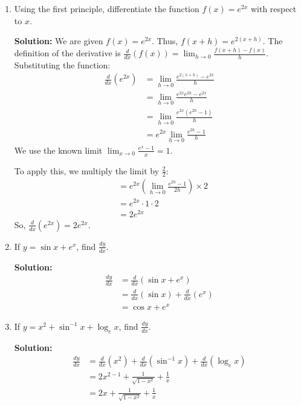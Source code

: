 \documentclass[nohyper,nobib,xcolor=dvipsnames,svgnames,x11names]{tufte-book}
\newenvironment{multiequation}{%
  \setlength{\abovedisplayskip}{3pt}      %
  \setlength{\belowdisplayskip}{6pt}      %
  \setlength{\abovedisplayshortskip}{3pt} %
  \setlength{\belowdisplayshortskip}{6pt} %
  \begin{equation}%
    \begin{aligned}%
}{%
    \end{aligned}%
  \end{equation}%
}
\newcommand{\fancymarginnote}[2][0pt]{%
  \marginnote[#1]{%
    \tikz[baseline=(text.base)]{%
      \node[
        fill=lightorange,
        draw=SeaGreen,
        line width=1pt,
        text=darkrose,
        rounded corners=3pt,
        inner sep=4pt,
        text width=\dimexpr\marginparwidth-8pt\relax,
        font=\footnotesize
      ] (text) {#2};
    }%
  }%
}
\begin{document}
\begin{enumerate}
    \item Using the first principle, differentiate the function $f(x)=e^{2x}$ with respect to $x$.
    
    \textbf{Solution:}
    We are given $f(x)=e^{2x}$. Thus, $f(x+h)=e^{2(x+h)}$.
    The definition of the derivative is $\frac{d}{dx}(f(x))=\lim_{h\to0}\frac{f(x+h)-f(x)}{h}$.
    Substituting the function:
    \begin{multiequation}
        \frac{d}{dx}(e^{2x}) &= \lim_{h\to0}\frac{e^{2(x+h)}-e^{2x}}{h} \\
        &= \lim_{h\to0}\frac{e^{2x}e^{2h}-e^{2x}}{h} \\
        &= \lim_{h\to0}\frac{e^{2x}(e^{2h}-1)}{h} \\
        &= e^{2x} \lim_{h\to0}\frac{e^{2h}-1}{h}
    \end{multiequation}
    We use the known limit $\lim_{x\to0}\frac{e^x-1}{x}=1$.\fancymarginnote{$\lim_{x\to0}\frac{e^x-1}{x}=1$}
    To apply this, we multiply the limit by $\frac{2}{2}$:
    \begin{multiequation}
        &= e^{2x} \left(\lim_{h\to0}\frac{e^{2h}-1}{2h}\right) \times 2 \\
        &= e^{2x} \cdot 1 \cdot 2 \\
        &= 2e^{2x}
    \end{multiequation}
    So, $\frac{d}{dx}(e^{2x})=2e^{2x}$.

    \item If $y=\sin x+e^{x}$, find $\frac{dy}{dx}$.
    
    \textbf{Solution:}
    \begin{multiequation}
        \frac{dy}{dx} &= \frac{d}{dx}(\sin x+e^{x}) \\
        &= \frac{d}{dx}(\sin x)+\frac{d}{dx}(e^{x}) \\
        &= \cos x+e^{x}
    \end{multiequation}

    \item If $y=x^{2}+\sin^{-1}x+\log_{e}x$, find $\frac{dy}{dx}$.
    
    \textbf{Solution:}
    \begin{multiequation}
        \frac{dy}{dx} &= \frac{d}{dx}(x^{2})+\frac{d}{dx}(\sin^{-1}x)+\frac{d}{dx}(\log_{e}x) \\
        &= 2x^{2-1}+\frac{1}{\sqrt{1-x^{2}}}+\frac{1}{x} \\
        &= 2x+\frac{1}{\sqrt{1-x^{2}}}+\frac{1}{x}
    \end{multiequation}


\end{enumerate}
\end{document}
